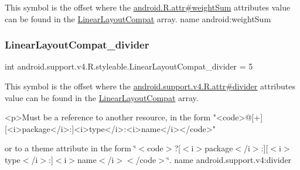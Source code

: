 This symbol is the offset where the \hyperlink{}{android.\+R.\+attr\#weight\+Sum} attribute\textquotesingle{}s value can be found in the \hyperlink{classandroid_1_1support_1_1v4_1_1R_1_1styleable_a5410acb05d349e2b35bd2dbadc93b229}{Linear\+Layout\+Compat} array.  name android\+:weight\+Sum \mbox{\label{classandroid_1_1support_1_1v4_1_1R_1_1styleable_ad062fe8676838d9c14d62ca0905d04c7}} 
\subsubsection{\texorpdfstring{Linear\+Layout\+Compat\+\_\+divider}{LinearLayoutCompat\_divider}}
{\footnotesize\ttfamily int android.\+support.\+v4.\+R.\+styleable.\+Linear\+Layout\+Compat\+\_\+divider = 5\hspace{0.3cm}{\ttfamily [static]}}

This symbol is the offset where the \hyperlink{classandroid_1_1support_1_1v4_1_1R_1_1attr_a47e79e4bd7c9a45a24028c0210cf5744}{android.\+support.\+v4.\+R.\+attr\#divider} attribute\textquotesingle{}s value can be found in the \hyperlink{classandroid_1_1support_1_1v4_1_1R_1_1styleable_a5410acb05d349e2b35bd2dbadc93b229}{Linear\+Layout\+Compat} array.

\begin{DoxyVerb}      <p>Must be a reference to another resource, in the form "<code>@[+][<i>package</i>:]<i>type</i>:<i>name</i></code>"
\end{DoxyVerb}
 or to a theme attribute in the form \char`\"{}$<$code$>$?\mbox{[}$<$i$>$package$<$/i$>$\+:\mbox{]}\mbox{[}$<$i$>$type$<$/i$>$\+:\mbox{]}$<$i$>$name$<$/i$>$$<$/code$>$\char`\"{}.  name android.\+support.\+v4\+:divider \mbox{\label{classandroid_1_1support_1_1v4_1_1R_1_1styleable_af6bd9621cf5c129d0028c9ac57569dc4}} 

